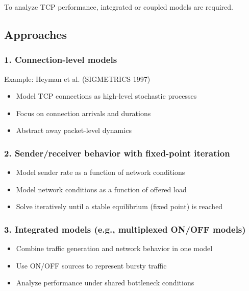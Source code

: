 To analyze TCP performance, integrated or coupled models are required.


\subsection*{Approaches}
\subsubsection*{1. Connection-level models}

Example: Heyman et al. (SIGMETRICS 1997)

\begin{itemize}
    \item Model TCP connections as high-level stochastic processes
    \item Focus on connection arrivals and durations
    \item Abstract away packet-level dynamics
\end{itemize}

\subsubsection*{2. Sender/receiver behavior with fixed-point iteration}

\begin{itemize}
    \item Model sender rate as a function of network conditions
    \item Model network conditions as a function of offered load
    \item Solve iteratively until a stable equilibrium (fixed point) is reached
\end{itemize}

\subsubsection*{3. Integrated models (e.g., multiplexed ON/OFF models)}

\begin{itemize}
    \item Combine traffic generation and network behavior in one model
    \item Use ON/OFF sources to represent bursty traffic
    \item Analyze performance under shared bottleneck conditions
\end{itemize}
